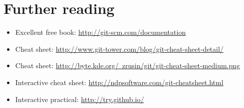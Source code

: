 \documentclass[10pt,a4paper]{beamer}
\begin{document}
\section{Further reading}
\begin{frame}
\begin{itemize}
\item Excellent free book: \href{http://git-scm.com/documentation}{\color{blue}http://git-scm.com/documentation}
\item Cheat sheet: \href{http://www.git-tower.com/blog/git-cheat-sheet-detail/}{\color{blue}http://www.git-tower.com/blog/git-cheat-sheet-detail/}
\item Cheat sheet: \href{http://byte.kde.org/~zrusin/git/git-cheat-sheet-medium.png}{\color{blue}http://byte.kde.org/~zrusin/git/git-cheat-sheet-medium.png}
\item Interactive cheat sheet: \href{http://ndpsoftware.com/git-cheatsheet.html}{\color{blue}http://ndpsoftware.com/git-cheatsheet.html}
\item Interactive practical: \href{http://try.github.io/}{\color{blue}http://try.github.io/}
\end{itemize}
\end{frame}
\end{document}
